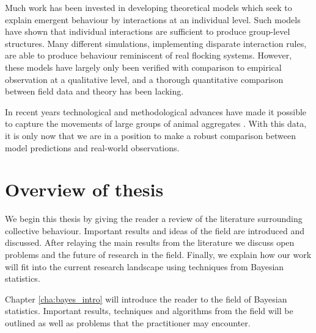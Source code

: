 Much work has been invested in developing theoretical models which seek to explain emergent behaviour by interactions at an individual level. Such models have shown that individual interactions are sufficient to produce group-level structures. Many different simulations, implementing disparate interaction rules, are able to produce behaviour reminiscent of real flocking systems. However, these models have largely only been verified with comparison to empirical observation at a qualitative level, and a thorough quantitative comparison between field data and theory has been lacking.

In recent years technological and methodological advances have made it possible to capture the movements of large groups of animal aggregates \citep{ballerini08}. With this data, it is only now that we are in a position to make a robust comparison between model predictions and real-world observations.

\section{Overview of thesis}
\label{sec:overview_of_thesis}

We begin this thesis by giving the reader a review of the literature surrounding collective behaviour. Important results and ideas of the field are introduced and discussed. After relaying the main results from the literature we discuss open problems and the future of research in the field. Finally, we explain how our work will fit into the current research landscape using techniques from Bayesian statistics.

Chapter \ref{cha:bayes_intro} will introduce the reader to the field of Bayesian statistics. Important results, techniques and algorithms from the field will be outlined as well as problems that the practitioner may encounter. 